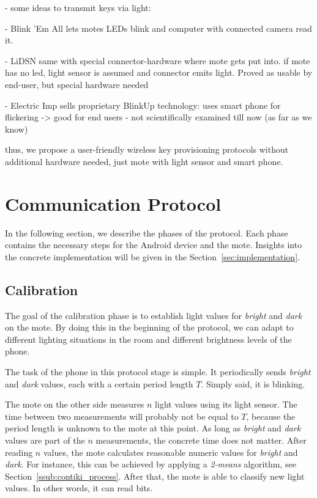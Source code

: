 \documentclass{sig-alternate} %
\begin{document}
- some ideas to transmit keys via light:

- Blink 'Em All \cite{saxena2009blink} lets motes LEDs blink and computer with connected camera read it.

- LiDSN \cite{doan2012lidsn} same with special connector-hardware where mote gets put into. if mote has no led, light sensor is assumed and connector emits light. Proved as usable by end-user, but special hardware needed

- Electric Imp \cite{electricimp} sells proprietary BlinkUp technology: uses smart phone for flickering -> good for end users
- not scientifically examined till now (as far as we know)

thus, we propose a user-friendly wireless key provisioning protocols without additional hardware needed, just mote with light sensor and smart phone.

\section{Communication Protocol}
\label{sec:communication_protocol}

In the following section, we describe the phases of the protocol.
Each phase contains the necessary steps for the Android device and the mote.
Insights into the concrete implementation will be given in the Section~\ref{sec:implementation}.

\subsection{Calibration}
\label{sub:calibration}

The goal of the calibration phase is to establish light values for \textit{bright} and \textit{dark} on the mote.
By doing this in the beginning of the protocol, we can adapt to different lighting situations in the room and different brightness levels of the phone.

The task of the phone in this protocol stage is simple.
It periodically sends \textit{bright} and \textit{dark} values, each with a certain period length $T$.
Simply said, it is blinking.

The mote on the other side measures $n$ light values using its light sensor.
The time between two measurements will probably not be equal to $T$, because the period length is unknown to the mote at this point.
As long as \textit{bright} and \textit{dark} values are part of the $n$ measurements, the concrete time does not matter.
After reading $n$ values, the mote calculates reasonable numeric values for \textit{bright} and \textit{dark}.
For instance, this can be achieved by applying a \mbox{\textit{2-means}} algorithm, see Section~\ref{ssub:contiki_process}.
After that, the mote is able to classify new light values.
In other words, it can read bits.
\end{document}
